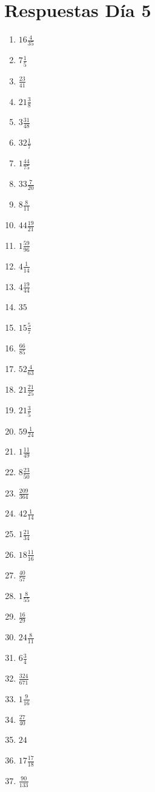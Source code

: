 \documentclass[12pt]{article}
\begin{document}
\section*{Respuestas Día 5}
\begin{enumerate}
\item $ 16 \frac{4}{35} $
\item $ 7 \frac{1}{5} $
\item $ \frac{23}{41} $
\item $ 21 \frac{3}{8} $
\item $ 3 \frac{31}{48} $
\item $ 32 \frac{1}{7} $
\item $ 1 \frac{44}{75} $
\item $ 33 \frac{7}{20} $
\item $ 8 \frac{8}{11} $
\item $ 44 \frac{19}{21} $
\item $ 1 \frac{59}{96} $
\item $ 4 \frac{1}{14} $
\item $ 4 \frac{19}{44} $
\item $ 35 $
\item $ 15 \frac{5}{7} $
\item $ \frac{66}{85} $
\item $ 52 \frac{4}{63} $
\item $ 21 \frac{21}{25} $
\item $ 21 \frac{3}{5} $
\item $ 59 \frac{1}{24} $
\item $ 1 \frac{11}{49} $
\item $ 8 \frac{23}{50} $
\item $ \frac{209}{364} $
\item $ 42 \frac{1}{14} $
\item $ 1 \frac{21}{34} $
\item $ 18 \frac{11}{16} $
\item $ \frac{40}{57} $
\item $ 1 \frac{8}{55} $
\item $ \frac{16}{29} $
\item $ 24 \frac{8}{11} $
\item $ 6 \frac{3}{4} $
\item $ \frac{324}{671} $
\item $ 1 \frac{9}{16} $
\item $ \frac{27}{40} $
\item $ 24 $
\item $ 17 \frac{17}{18} $
\item $ \frac{90}{133} $

\end{enumerate}
\end{document}
